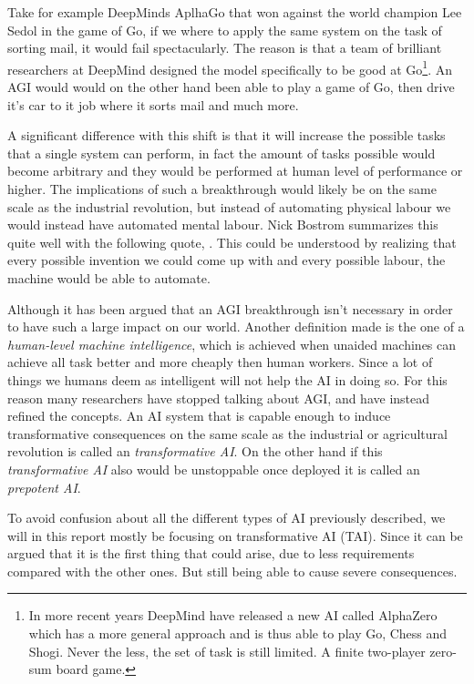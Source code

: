 \documentclass[12pt,A4]{report}
\theoremstyle{definition}
\begin{document}
Take for example DeepMinds AplhaGo that won against the world champion Lee Sedol in the game of Go, if we where to apply the same system on the task of sorting mail, it would fail spectacularly. The reason is that a team of brilliant researchers at DeepMind designed the model specifically to be good at Go\footnote{In more recent years DeepMind have released a new AI called AlphaZero which has a more general approach and is thus able to play Go, Chess and Shogi. Never the less, the set of task is still limited. A finite two-player zero-sum board game.}. An AGI would would on the other hand been able to play a game of Go, then drive it's car to it job where it sorts mail and much more. 

A significant difference with this shift is that it will increase the possible tasks that a single system can perform, in fact the amount of tasks possible would become arbitrary and they would be performed at human level of performance or higher. The implications of such a breakthrough would likely be on the same scale as the industrial revolution, but instead of automating physical labour we would instead have automated mental labour. Nick Bostrom summarizes this quite well with the following quote, \autocite{Bostrom}. This could be understood by realizing that every possible invention we could come up with and every possible labour, the machine would be able to automate.

Although it has been argued that an AGI breakthrough isn't necessary in order to have such a large impact on our world. Another definition made is the one of a \textit{human-level machine intelligence}, which is achieved when unaided machines can achieve all task better and more cheaply then human workers. Since a lot of things we humans deem as intelligent will not help the AI in doing so. For this reason many researchers have stopped talking about AGI, and have instead refined the concepts. An AI system that is capable enough to induce transformative consequences on the same scale as the industrial or agricultural revolution is called an \textit{transformative AI}. On the other hand if this \textit{transformative AI} also would be unstoppable once deployed it is called an \textit{prepotent AI}. 

To avoid confusion about all the different types of AI previously described, we will in this report mostly be focusing on transformative AI (TAI). Since it can be argued that it is the first thing that could arise, due to less requirements compared with the other ones. But still being able to cause severe consequences. 
\end{document}
